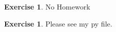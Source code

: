\documentclass[letterpaper,12pt]{article}
\theoremstyle{definition}
\newtheorem{exercise}[theorem]{Exercise}
\begin{document}
\begin{spacing}{1.5}
	\begin{exercise} \label{DSGE_HW_Base_TotalDiff}
No Homework
	\end{exercise}

	\begin{exercise} \label{DSGE_HW_BM_Grid}
Please see my py file.
	\end{exercise}







	


\end{spacing}
\end{document}

